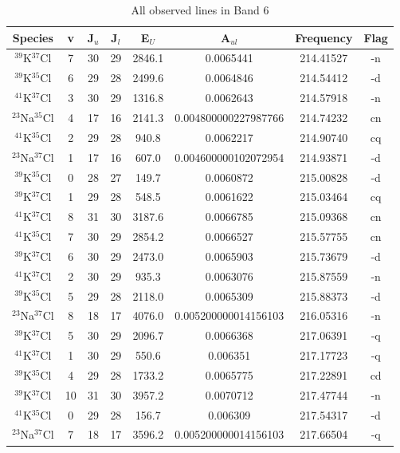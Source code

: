 \begin{table*}[htp]
\centering
\caption{All observed lines in Band 6}
\begin{tabular}{cccccccc}
\label{tab:all_detections_B6}
Species & v & J$_u$ & J$_l$ & E$_U$ & A$_{ul}$ & Frequency & Flag \\
\hline
$^{39}$K$^{37}$Cl & 7 & 30 & 29 & 2846.1 & 0.0065441 & 214.41527 & -n \\
$^{39}$K$^{35}$Cl & 6 & 29 & 28 & 2499.6 & 0.0064846 & 214.54412 & -d \\
$^{41}$K$^{37}$Cl & 3 & 30 & 29 & 1316.8 & 0.0062643 & 214.57918 & -n \\
$^{23}$Na$^{35}$Cl & 4 & 17 & 16 & 2141.3 & 0.004800000227987766 & 214.74232 & cn \\
$^{41}$K$^{35}$Cl & 2 & 29 & 28 & 940.8 & 0.0062217 & 214.90740 & cq \\
$^{23}$Na$^{37}$Cl & 1 & 17 & 16 & 607.0 & 0.004600000102072954 & 214.93871 & -d \\
$^{39}$K$^{35}$Cl & 0 & 28 & 27 & 149.7 & 0.0060872 & 215.00828 & -d \\
$^{39}$K$^{37}$Cl & 1 & 29 & 28 & 548.5 & 0.0061622 & 215.03464 & cq \\
$^{41}$K$^{37}$Cl & 8 & 31 & 30 & 3187.6 & 0.0066785 & 215.09368 & cn \\
$^{41}$K$^{35}$Cl & 7 & 30 & 29 & 2854.2 & 0.0066527 & 215.57755 & cn \\
$^{39}$K$^{37}$Cl & 6 & 30 & 29 & 2473.0 & 0.0065903 & 215.73679 & -d \\
$^{41}$K$^{37}$Cl & 2 & 30 & 29 & 935.3 & 0.0063076 & 215.87559 & -n \\
$^{39}$K$^{35}$Cl & 5 & 29 & 28 & 2118.0 & 0.0065309 & 215.88373 & -d \\
$^{23}$Na$^{37}$Cl & 8 & 18 & 17 & 4076.0 & 0.005200000014156103 & 216.05316 & -n \\
$^{39}$K$^{37}$Cl & 5 & 30 & 29 & 2096.7 & 0.0066368 & 217.06391 & -q \\
$^{41}$K$^{37}$Cl & 1 & 30 & 29 & 550.6 & 0.006351 & 217.17723 & -q \\
$^{39}$K$^{35}$Cl & 4 & 29 & 28 & 1733.2 & 0.0065775 & 217.22891 & cd \\
$^{39}$K$^{37}$Cl & 10 & 31 & 30 & 3957.2 & 0.0070712 & 217.47744 & -n \\
$^{41}$K$^{35}$Cl & 0 & 29 & 28 & 156.7 & 0.006309 & 217.54317 & -d \\
$^{23}$Na$^{37}$Cl & 7 & 18 & 17 & 3596.2 & 0.005200000014156103 & 217.66504 & -q \\

\end{tabular}
\end{table*}
